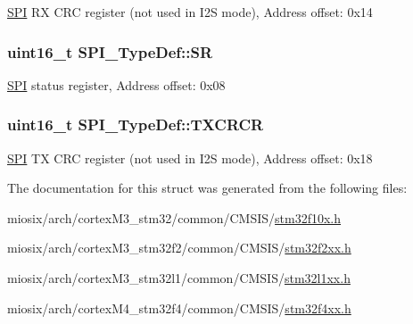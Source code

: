 \hyperlink{class_s_p_i}{S\-P\-I} R\-X C\-R\-C register (not used in I2\-S mode), Address offset\-: 0x14 \hypertarget{struct_s_p_i___type_def_a017d7d54a7bf1925facea6b5e02fec83}{
\subsubsection[{S\-R}]{ uint16\-\_\-t S\-P\-I\-\_\-\-Type\-Def\-::\-S\-R}}\label{struct_s_p_i___type_def_a017d7d54a7bf1925facea6b5e02fec83}
\hyperlink{class_s_p_i}{S\-P\-I} status register, Address offset\-: 0x08 \hypertarget{struct_s_p_i___type_def_a3c0c1be66bc0a1846274a7511f4a36f5}{
\subsubsection[{T\-X\-C\-R\-C\-R}]{ uint16\-\_\-t S\-P\-I\-\_\-\-Type\-Def\-::\-T\-X\-C\-R\-C\-R}}\label{struct_s_p_i___type_def_a3c0c1be66bc0a1846274a7511f4a36f5}
\hyperlink{class_s_p_i}{S\-P\-I} T\-X C\-R\-C register (not used in I2\-S mode), Address offset\-: 0x18 

The documentation for this struct was generated from the following files\-:\begin{DoxyCompactItemize}
\item 
miosix/arch/cortex\-M3\-\_\-stm32/common/\-C\-M\-S\-I\-S/\hyperlink{stm32f10x_8h}{stm32f10x.\-h}\item 
miosix/arch/cortex\-M3\-\_\-stm32f2/common/\-C\-M\-S\-I\-S/\hyperlink{stm32f2xx_8h}{stm32f2xx.\-h}\item 
miosix/arch/cortex\-M3\-\_\-stm32l1/common/\-C\-M\-S\-I\-S/\hyperlink{stm32l1xx_8h}{stm32l1xx.\-h}\item 
miosix/arch/cortex\-M4\-\_\-stm32f4/common/\-C\-M\-S\-I\-S/\hyperlink{stm32f4xx_8h}{stm32f4xx.\-h}\end{DoxyCompactItemize}
